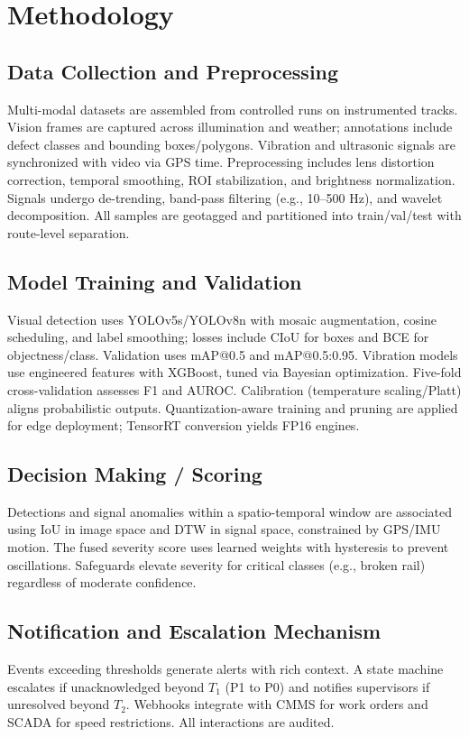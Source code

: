 \documentclass[conference]{IEEEtran}
\begin{document}
\section{Methodology}
\label{sec:method}
\subsection{Data Collection and Preprocessing}
Multi-modal datasets are assembled from controlled runs on instrumented tracks. Vision frames are captured across illumination and weather; annotations include defect classes and bounding boxes/polygons. Vibration and ultrasonic signals are synchronized with video via GPS time. Preprocessing includes lens distortion correction, temporal smoothing, ROI stabilization, and brightness normalization. Signals undergo de-trending, band-pass filtering (e.g., 10--500 Hz), and wavelet decomposition. All samples are geotagged and partitioned into train/val/test with route-level separation.

\subsection{Model Training and Validation}
Visual detection uses YOLOv5s/YOLOv8n with mosaic augmentation, cosine scheduling, and label smoothing; losses include CIoU for boxes and BCE for objectness/class. Validation uses mAP@0.5 and mAP@0.5:0.95. Vibration models use engineered features with XGBoost, tuned via Bayesian optimization. Five-fold cross-validation assesses F1 and AUROC. Calibration (temperature scaling/Platt) aligns probabilistic outputs. Quantization-aware training and pruning are applied for edge deployment; TensorRT conversion yields FP16 engines.

\subsection{Decision Making / Scoring}
Detections and signal anomalies within a spatio-temporal window are associated using IoU in image space and DTW in signal space, constrained by GPS/IMU motion. The fused severity score uses learned weights with hysteresis to prevent oscillations. Safeguards elevate severity for critical classes (e.g., broken rail) regardless of moderate confidence.

\subsection{Notification and Escalation Mechanism}
Events exceeding thresholds generate alerts with rich context. A state machine escalates if unacknowledged beyond $T_1$ (P1 to P0) and notifies supervisors if unresolved beyond $T_2$. Webhooks integrate with CMMS for work orders and SCADA for speed restrictions. All interactions are audited.
\end{document}
